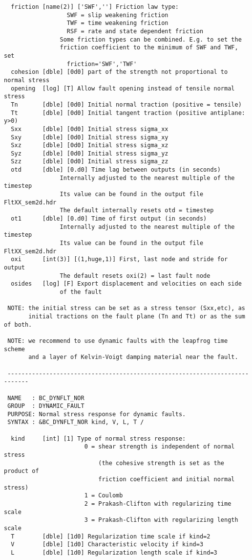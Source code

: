 \begin{verbatim}
  friction [name(2)] ['SWF',''] Friction law type:
                  SWF = slip weakening friction
                  TWF = time weakening friction
                  RSF = rate and state dependent friction
                Some friction types can be combined. E.g. to set the 
                friction coefficient to the minimum of SWF and TWF, set 
                  friction='SWF','TWF'
  cohesion [dble] [0d0] part of the strength not proportional to normal stress
  opening  [log] [T] Allow fault opening instead of tensile normal stress
  Tn       [dble] [0d0] Initial normal traction (positive = tensile)
  Tt       [dble] [0d0] Initial tangent traction (positive antiplane: y>0)
  Sxx      [dble] [0d0] Initial stress sigma_xx
  Sxy      [dble] [0d0] Initial stress sigma_xy
  Sxz      [dble] [0d0] Initial stress sigma_xz
  Syz      [dble] [0d0] Initial stress sigma_yz
  Szz      [dble] [0d0] Initial stress sigma_zz
  otd      [dble] [0.d0] Time lag between outputs (in seconds)
                Internally adjusted to the nearest multiple of the timestep
                Its value can be found in the output file FltXX_sem2d.hdr
                The default internally resets otd = timestep
  ot1      [dble] [0.d0] Time of first output (in seconds)
                Internally adjusted to the nearest multiple of the timestep
                Its value can be found in the output file FltXX_sem2d.hdr
  oxi      [int(3)] [(1,huge,1)] First, last node and stride for output
                The default resets oxi(2) = last fault node
  osides   [log] [F] Export displacement and velocities on each side
                of the fault

 NOTE: the initial stress can be set as a stress tensor (Sxx,etc), as
       initial tractions on the fault plane (Tn and Tt) or as the sum of both.

 NOTE: we recommend to use dynamic faults with the leapfrog time scheme
       and a layer of Kelvin-Voigt damping material near the fault.

 ----------------------------------------------------------------------------

 NAME   : BC_DYNFLT_NOR
 GROUP  : DYNAMIC_FAULT
 PURPOSE: Normal stress response for dynamic faults.
 SYNTAX : &BC_DYNFLT_NOR kind, V, L, T /

  kind     [int] [1] Type of normal stress response:
                       0 = shear strength is independent of normal stress
                           (the cohesive strength is set as the product of
                           friction coefficient and initial normal stress)
                       1 = Coulomb 
                       2 = Prakash-Clifton with regularizing time scale
                       3 = Prakash-Clifton with regularizing length scale
  T        [dble] [1d0] Regularization time scale if kind=2
  V        [dble] [1d0] Characteristic velocity if kind=3
  L        [dble] [1d0] Regularization length scale if kind=3


\end{verbatim}
